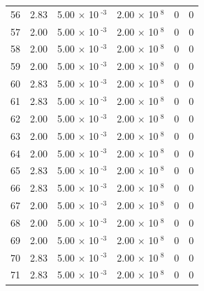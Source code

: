 \documentclass[a4paper,11pt]{article}
\begin{document}
\begin{center}
\begin{longtable}{|R{1.5cm}|R{2.4cm}|R{2.4cm}|R{2.4cm}|R{2.4cm}|R{2.4cm}|}
   56 &   2.83  &         5.00 $\times$ 10$^{\text{          -3}}$  &         2.00 $\times$ 10$^{\text{           8}}$  & 0  & 0 \\
   57 &   2.00  &         5.00 $\times$ 10$^{\text{          -3}}$  &         2.00 $\times$ 10$^{\text{           8}}$  & 0  & 0 \\
   58 &   2.00  &         5.00 $\times$ 10$^{\text{          -3}}$  &         2.00 $\times$ 10$^{\text{           8}}$  & 0  & 0 \\
   59 &   2.00  &         5.00 $\times$ 10$^{\text{          -3}}$  &         2.00 $\times$ 10$^{\text{           8}}$  & 0  & 0 \\
   60 &   2.83  &         5.00 $\times$ 10$^{\text{          -3}}$  &         2.00 $\times$ 10$^{\text{           8}}$  & 0  & 0 \\
   61 &   2.83  &         5.00 $\times$ 10$^{\text{          -3}}$  &         2.00 $\times$ 10$^{\text{           8}}$  & 0  & 0 \\
   62 &   2.00  &         5.00 $\times$ 10$^{\text{          -3}}$  &         2.00 $\times$ 10$^{\text{           8}}$  & 0  & 0 \\
   63 &   2.00  &         5.00 $\times$ 10$^{\text{          -3}}$  &         2.00 $\times$ 10$^{\text{           8}}$  & 0  & 0 \\
   64 &   2.00  &         5.00 $\times$ 10$^{\text{          -3}}$  &         2.00 $\times$ 10$^{\text{           8}}$  & 0  & 0 \\
   65 &   2.83  &         5.00 $\times$ 10$^{\text{          -3}}$  &         2.00 $\times$ 10$^{\text{           8}}$  & 0  & 0 \\
   66 &   2.83  &         5.00 $\times$ 10$^{\text{          -3}}$  &         2.00 $\times$ 10$^{\text{           8}}$  & 0  & 0 \\
   67 &   2.00  &         5.00 $\times$ 10$^{\text{          -3}}$  &         2.00 $\times$ 10$^{\text{           8}}$  & 0  & 0 \\
   68 &   2.00  &         5.00 $\times$ 10$^{\text{          -3}}$  &         2.00 $\times$ 10$^{\text{           8}}$  & 0  & 0 \\
   69 &   2.00  &         5.00 $\times$ 10$^{\text{          -3}}$  &         2.00 $\times$ 10$^{\text{           8}}$  & 0  & 0 \\
   70 &   2.83  &         5.00 $\times$ 10$^{\text{          -3}}$  &         2.00 $\times$ 10$^{\text{           8}}$  & 0  & 0 \\
   71 &   2.83  &         5.00 $\times$ 10$^{\text{          -3}}$  &         2.00 $\times$ 10$^{\text{           8}}$  & 0  & 0 \\

\end{longtable}
\end{center}
\end{document}
